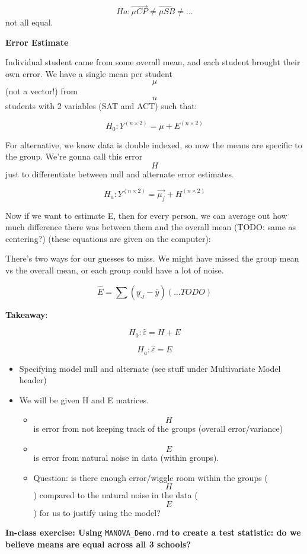 \documentclass[]{article}
\providecommand{\tightlist}{%
  \setlength{\itemsep}{0pt}\setlength{\parskip}{0pt}}
\begin{document}
\[Ha: \vec{\mu{CP}} \ne \vec{\mu{SB}} \ne ... \] not all equal.

\textbf{Error Estimate}

Individual student came from some overall mean, and each student brought
their own error. We have a single mean per student \[\mu\] (not a
vector!) from \[n\] students with 2 variables (SAT and ACT) such that:

\[ H_0: Y^{(n \times 2)} = \mu + E^{(n \times 2)} \]

For alternative, we know data is double indexed, so now the means are
specific to the group. We're gonna call this error \[H\] just to
differentiate between null and alternate error estimates.

\[ H_a: Y^{(n \times 2)} = \vec{\mu_j} + H^{(n \times 2)} \]

Now if we want to estimate E, then for every person, we can average out
how much difference there was between them and the overall mean (TODO:
same as centering?) (these equations are given on the computer):

There's two ways for our guesses to miss. We might have missed the group
mean vs the overall mean, or each group could have a lot of noise.

\[ \hat{E} = \sum (y_{.j} - \bar{y})( ... TODO)\]

\textbf{Takeaway}:

\[H_0: \hat{\varepsilon} = H + E\]

\[H_a: \hat{\varepsilon} = E \]

\begin{itemize}
\item
  Specifying model null and alternate (see stuff under Multivariate
  Model header)
\item
  We will be given H and E matrices.

  \begin{itemize}
  \tightlist
  \item
    \[H\] is error from not keeping track of the groups (overall
    error/variance)
  \item
    \[E\] is error from natural noise in data (within groups).
  \item
    Question: is there enough error/wiggle room within the groups
    (\[H\]) compared to the natural noise in the data (\[E\]) for us to
    justify using the model?
  \end{itemize}
\end{itemize}

\textbf{In-class exercise: Using} \texttt{MANOVA\_Demo.rmd} \textbf{to
create a test statistic: do we believe means are equal across all 3
schools?}
\end{document}
